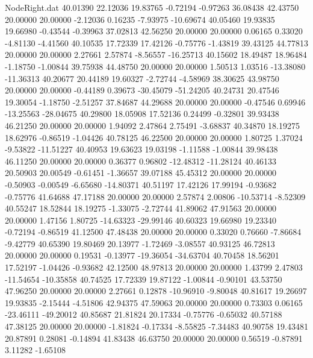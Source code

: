 \begin{filecontents}{NodeRight.dat}
  40.01390   22.12036   19.83765    -0.72194   -0.97263   36.08438   42.43750   20.00000   20.00000   -2.12036    0.16235   -7.93975  -10.69674
  40.05460   19.93835   19.66980    -0.43544   -0.39963   37.02813   42.56250   20.00000   20.00000    0.06165    0.33020   -4.81130   -4.41560
  40.10535   17.72339   17.42126    -0.75776   -1.43819   39.43125   44.77813   20.00000   20.00000    2.27661    2.57874   -8.56557  -16.25713
  40.15602   18.49487   18.96484    -1.18750   -1.00844   39.75938   44.48750   20.00000   20.00000    1.50513    1.03516  -13.38080  -11.36313
  40.20677   20.44189   19.60327    -2.72744   -4.58969   38.30625   43.98750   20.00000   20.00000   -0.44189    0.39673  -30.45079  -51.24205
  40.24731   20.47546   19.30054    -1.18750   -2.51257   37.84687   44.29688   20.00000   20.00000   -0.47546    0.69946  -13.25563  -28.04675
  40.29800   18.05908   17.52136     0.24499   -0.32801   39.93438   46.21250   20.00000   20.00000    1.94092    2.47864    2.75491   -3.68837
  40.34870   18.19275   18.62976    -0.86519   -1.04426   40.78125   46.22500   20.00000   20.00000    1.80725    1.37024   -9.53822  -11.51227
  40.40953   19.63623   19.03198    -1.11588   -1.00844   39.98438   46.11250   20.00000   20.00000    0.36377    0.96802  -12.48312  -11.28124
  40.46133   20.50903   20.00549    -0.61451   -1.36657   39.07188   45.45312   20.00000   20.00000   -0.50903   -0.00549   -6.65680  -14.80371
  40.51197   17.42126   17.99194    -0.93682   -0.75776   41.64688   47.17188   20.00000   20.00000    2.57874    2.00806  -10.53714   -8.52309
  40.55247   18.52844   18.19275    -1.33075   -2.72744   41.89062   47.91563   20.00000   20.00000    1.47156    1.80725  -14.63323  -29.99146
  40.60323   19.66980   19.23340    -0.72194   -0.86519   41.12500   47.48438   20.00000   20.00000    0.33020    0.76660   -7.86684   -9.42779
  40.65390   19.80469   20.13977    -1.72469   -3.08557   40.93125   46.72813   20.00000   20.00000    0.19531   -0.13977  -19.36054  -34.63704
  40.70458   18.56201   17.52197    -1.04426   -0.93682   42.12500   48.97813   20.00000   20.00000    1.43799    2.47803  -11.54654  -10.35858
  40.74525   17.72339   19.87122    -1.00844   -0.90101   43.53750   47.96250   20.00000   20.00000    2.27661    0.12878  -10.96910   -9.80048
  40.81617   19.26697   19.93835    -2.15444   -4.51806   42.94375   47.59063   20.00000   20.00000    0.73303    0.06165  -23.46111  -49.20012
  40.85687   21.81824   20.17334    -0.75776   -0.65032   40.57188   47.38125   20.00000   20.00000   -1.81824   -0.17334   -8.55825   -7.34483
  40.90758   19.43481   20.87891     0.28081   -0.14894   41.83438   46.63750   20.00000   20.00000    0.56519   -0.87891    3.11282   -1.65108

\end{filecontents}
